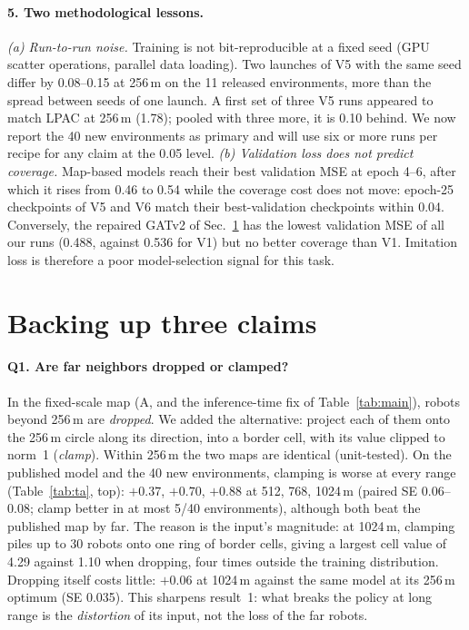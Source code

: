 \documentclass{article}
\begin{document}
\paragraph{5. Two methodological lessons.}\label{sec:lessons}
\emph{(a) Run-to-run noise.} Training is not bit-reproducible at a fixed seed (GPU scatter operations, parallel data loading). Two launches of V5 with the same seed differ by 0.08--0.15 at 256\,m on the 11 released environments, more than the spread between seeds of one launch. A first set of three V5 runs appeared to match LPAC at 256\,m (1.78); pooled with three more, it is 0.10 behind. We now report the 40 new environments as primary and will use six or more runs per recipe for any claim at the 0.05 level. \emph{(b) Validation loss does not predict coverage.} Map-based models reach their best validation MSE at epoch 4--6, after which it rises from 0.46 to 0.54 while the coverage cost does not move: epoch-25 checkpoints of V5 and V6 match their best-validation checkpoints within 0.04. Conversely, the repaired GATv2 of Sec.~\ref{sec:ta} has the lowest validation MSE of all our runs (0.488, against 0.536 for V1) but no better coverage than V1. Imitation loss is therefore a poor model-selection signal for this task.

\section{Backing up three claims}\label{sec:ta}
\paragraph{Q1. Are far neighbors dropped or clamped?} In the fixed-scale map (A, and the inference-time fix of Table~\ref{tab:main}), robots beyond 256\,m are \emph{dropped}. We added the alternative: project each of them onto the 256\,m circle along its direction, into a border cell, with its value clipped to norm~1 (\emph{clamp}). Within 256\,m the two maps are identical (unit-tested). On the published model and the 40 new environments, clamping is worse at every range (Table~\ref{tab:ta}, top): $+0.37$, $+0.70$, $+0.88$ at 512, 768, 1024\,m (paired SE 0.06--0.08; clamp better in at most 5/40 environments), although both beat the published map by far. The reason is the input's magnitude: at 1024\,m, clamping piles up to 30 robots onto one ring of border cells, giving a largest cell value of 4.29 against 1.10 when dropping, four times outside the training distribution. Dropping itself costs little: $+0.06$ at 1024\,m against the same model at its 256\,m optimum (SE 0.035). This sharpens result~1: what breaks the policy at long range is the \emph{distortion} of its input, not the loss of the far robots.
\end{document}
